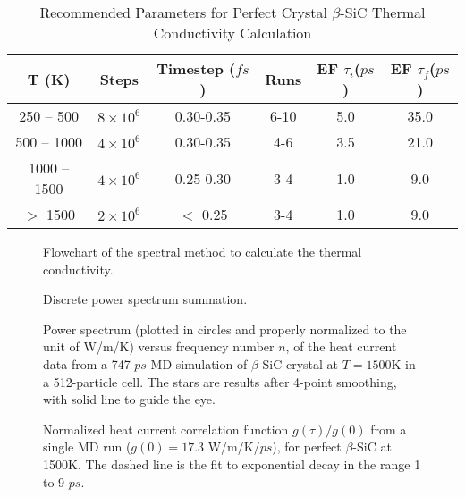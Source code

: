 \widetext

\newpage
\begin{table}
\caption{Recommended Parameters for Perfect Crystal
  $\beta$-SiC Thermal Conductivity Calculation}
\begin{tabular}{|c|c|c|c|c|c|}
\hline
T (K) & Steps     & Timestep ($fs$) & Runs
      & EF $\tau_i$($ps$) & EF $\tau_f$($ps$) \\ \hline
250 -- 500           & $8\times 10^6$ &  0.30-0.35         &  6-10
      &  5.0             &  35.0          \\
500 -- 1000          & $4\times 10^6$ &  0.30-0.35         &  4-6
      &  3.5             &  21.0           \\
1000 -- 1500         & $4\times 10^6$ &  0.25-0.30         &  3-4
      &  1.0             &  9.0            \\
 $>$ 1500              & $2\times 10^6$ &   $<$ 0.25           &  3-4
      &  1.0             &  9.0            \\
\hline
\end{tabular}
\label{param}
\end{table}
\vspace{10mm} 

\newpage

\begin{figure}
\caption{Flowchart of the spectral method to 
calculate the thermal conductivity.}
\label{flowchart}
\end{figure}

\begin{figure}
\caption{Discrete power spectrum summation.}
\label{noise}
\end{figure}

\begin{figure}
\caption{Power spectrum 
  (plotted in circles and properly normalized to the unit of W/m/K)
  versus frequency number $n$, of the heat current data from a 747
  $ps$ MD simulation of $\beta$-SiC crystal at $T=1500$K in a
  512-particle cell. The stars are results after 4-point smoothing,
  with solid line to guide the eye.}
\label{freq5}
\end{figure}

\begin{figure}
\caption{Normalized heat current correlation function $g(\tau)/g(0)$
  from a single MD run ($g(0) = 17.3$ W/m/K/$ps$), for perfect
  $\beta$-SiC at 1500K. The dashed line is the fit to exponential
  decay in the range 1 to 9 $ps$.}
\label{corr5}
\end{figure}

